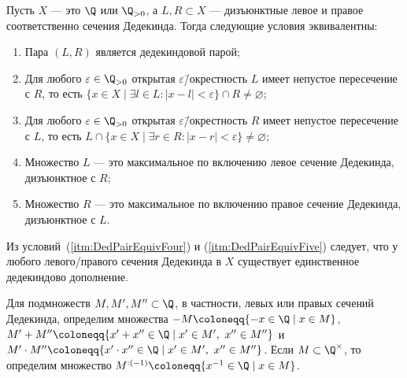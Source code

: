 \documentclass[
	extrafontsizes,
	11pt,
	hyphens,
]{memoir}
\begin{document}
\begin{observation}
Пусть \(X\) --- это \(\Q\) или \(\Q_{>0}\),
а \(L, R \subset X\) --- дизъюнктные левое и правое соответственно сечения Дедекинда.
Тогда следующие условия эквивалентны:
\begin{enumerate}[
	font=\upshape,
	label=\asbuk*),
	ref=\asbuk*,
	]

\item \label{itm:DedPairEquivOne}
Пара \((L, R)\) является дедекиндовой парой;

\item \label{itm:DedPairEquivTwo}
Для любого \(\varepsilon \in \Q_{>0}\) открытая \(\varepsilon\)\=/окрестность \(L\) имеет непустое пересечение с \(R\),
то есть
\(\{x \in X \mid \exists l \in L : \lvert x - l \rvert < \varepsilon\} \cap R \neq \varnothing\);

\item \label{itm:DedPairEquivThree}
Для любого \(\varepsilon \in \Q_{>0}\) открытая \(\varepsilon\)\=/окрестность \(R\) имеет непустое пересечение с \(L\),
то есть
\(L \cap \{x \in X \mid \exists r \in R : \lvert x - r \rvert < \varepsilon\} \neq \varnothing\);

\item \label{itm:DedPairEquivFour}
Множество \(L\) --- это максимальное по включению левое сечение Дедекинда, дизъюнктное с \(R\);

\item \label{itm:DedPairEquivFive}
Множество \(R\) --- это максимальное по включению правое сечение Дедекинда, дизъюнктное с \(L\).

\end{enumerate}
Из условий~(\ref{itm:DedPairEquivFour}) и (\ref{itm:DedPairEquivFive}) следует, что у любого левого/правого сечения Дедекинда в \(X\) существует единственное дедекиндово дополнение.
\end{observation}

\begin{definition}
Для подмножеств \(M, M', M'' \subset \Q\),
в частности, левых или правых сечений Дедекинда,
определим множества
\(-M \coloneqq \{-x \in \Q \mid x \in M\}\),
\(M' + M'' \coloneqq \{x' + x'' \in \Q \mid x' \in M',\ x'' \in M''\}\) и
\(M' \cdot M'' \coloneqq \{x' \cdot x'' \in \Q \mid x' \in M',\ x'' \in M''\}\).
Если \(M \subset \Q^\times\), то определим множество
\(M^{:(-1)} \coloneqq \{x^{-1} \in \Q \mid x \in M\}\).
\end{definition}
\end{document}
